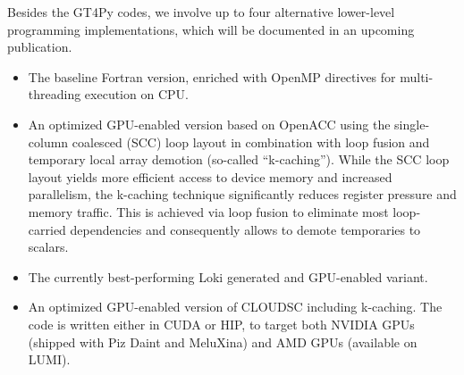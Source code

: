 \documentclass[gmd,manuscript,online]{copernicus}
\begin{document}
	Besides the GT4Py codes, we involve up to four alternative lower-level programming implementations, which will be documented in an upcoming publication.
	\begin{itemize}
		\item[(a)] The baseline Fortran version, enriched with OpenMP directives for multi-threading execution on CPU.
		\item[(b)] An optimized GPU-enabled version based on OpenACC using the single-column coalesced (SCC) loop layout in combination with loop fusion and temporary local array demotion (so-called ``k-caching''). While the SCC loop layout yields more efficient access to device memory and increased parallelism, the k-caching technique significantly reduces register pressure and memory traffic. This is achieved via loop fusion to eliminate most loop-carried dependencies and consequently allows to demote temporaries to scalars.
		\item[(c)] The currently best-performing Loki generated and GPU-enabled variant.
		\item[(d)] An optimized GPU-enabled version of CLOUDSC including k-caching. The code is written either in CUDA or HIP, to target both NVIDIA GPUs (shipped with Piz Daint and MeluXina) and AMD GPUs (available on LUMI).
	\end{itemize}
\end{document}
